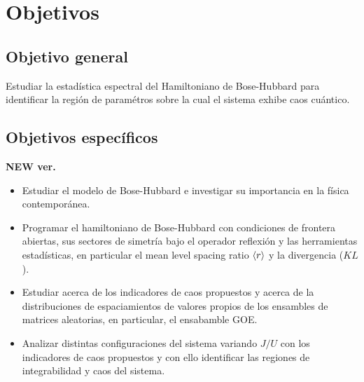 \documentclass[spanish,titlepage,table]{practicas}
\begin{document}
\section{Objetivos}\label{sec:objetivos}
\subsection{Objetivo general}
  Estudiar la estadística espectral del Hamiltoniano de Bose-Hubbard para identificar la región de paramétros sobre la cual 
 el sistema exhibe caos cuántico.
 \subsection{Objetivos específicos}
 \textbf{NEW ver.}
  \begin{itemize}
    \item Estudiar el modelo de Bose-Hubbard e investigar su importancia en la física contemporánea.
    \item Programar el hamiltoniano de Bose-Hubbard con condiciones de frontera abiertas, sus sectores de simetría bajo el operador reflexión y las herramientas estadísticas, en particular el mean level spacing ratio $\ev{r}$ y la divergencia ($KL$).
    \item Estudiar acerca de los indicadores de caos propuestos y acerca de la distribuciones de espaciamientos de valores propios de los ensambles de matrices aleatorias, en particular, el ensabamble GOE.
    \item Analizar distintas configuraciones del sistema variando $J/U$ con los indicadores de caos propuestos y con ello identificar las regiones de integrabilidad y caos del sistema.
 \end{itemize}
 
\end{document}
